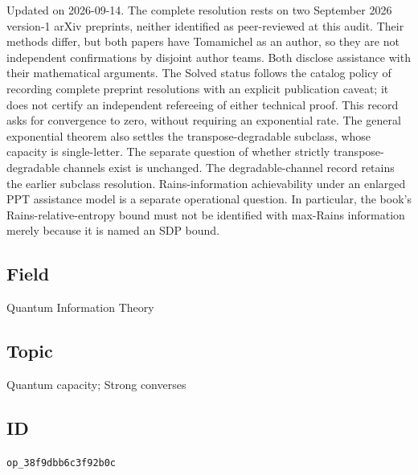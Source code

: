 Updated on 2026-09-14. The complete resolution rests on two September 2026 version-1 arXiv preprints, neither identified as peer-reviewed at this audit. Their methods differ, but both papers have Tomamichel as an author, so they are not independent confirmations by disjoint author teams. Both disclose assistance with their mathematical arguments. The Solved status follows the catalog policy of recording complete preprint resolutions with an explicit publication caveat; it does not certify an independent refereeing of either technical proof. This record asks for convergence to zero, without requiring an exponential rate. The general exponential theorem also settles the transpose-degradable subclass, whose capacity is single-letter. The separate question of whether strictly transpose-degradable channels exist is unchanged. The degradable-channel record retains the earlier subclass resolution. Rains-information achievability under an enlarged PPT assistance model is a separate operational question. In particular, the book's Rains-relative-entropy bound must not be identified with max-Rains information merely because it is named an SDP bound.

\subsection*{Field}

Quantum Information Theory

\subsection*{Topic}

Quantum capacity; Strong converses

\subsection*{ID}

\texttt{op\_38f9dbb6c3f92b0c}
